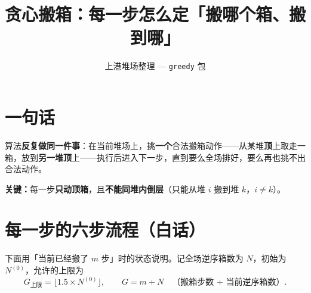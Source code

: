 \documentclass[11pt,a4paper]{ctexart}
\title{贪心搬箱：每一步怎么定「搬哪个箱、搬到哪」}
\author{上港堆场整理 --- \texttt{greedy} 包}
\date{}
\newcommand{\capG}{G_{\mathrm{上限}}}
\begin{document}
\maketitle

\section{一句话}

算法\textbf{反复做同一件事}：在当前堆场上，挑\textbf{一个}合法搬箱动作——从某堆\textbf{顶}上取走一箱，放到\textbf{另一堆顶}上——执行后进入下一步，直到要么全场排好，要么再也挑不出合法动作。

\textbf{关键：}每一步\textbf{只动顶箱}，且\textbf{不能同堆内倒层}（只能从堆 $i$ 搬到堆 $k$，$i\neq k$）。

\section{每一步的六步流程（白话）}

下面用「当前已经搬了 $m$ 步」时的状态说明。记全场逆序箱数为 $N$，初始为 $N^{(0)}$，允许的上限为
\[
  \capG = \bigl\lfloor 1.5 \times N^{(0)} \bigr\rfloor,
  \qquad
  G = m + N \quad \text{（搬箱步数 + 当前逆序箱数）}.
\]
\end{document}

